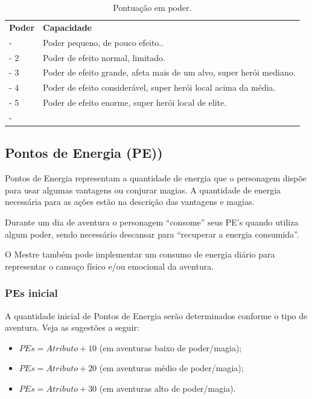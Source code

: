 \begin{table}[htb]
	\centering\smaller
	\caption{Pontuação em poder.}
	\begin{tabu} to 0.85\textwidth{|X[c]|X[2c]|} \hline
		\textbf{Poder}	 &	\textbf{Capacidade}  \\ \tabucline-
				 		& Poder pequeno, de pouco efeito..	\\ \tabucline-
		2		  		& Poder de efeito normal, limitado. \\ \tabucline-
		3		 		& Poder de efeito grande, afeta mais de um alvo, super herói mediano. 	\\ \tabucline-
		4		   		& Poder de efeito considerável, super herói local acima da média. 		\\ \tabucline-
		5		 	  	& Poder de efeito enorme, super herói local de elite. 	\\ \tabucline-
	\end{tabu}
	\label{tbl:poder}
\end{table}


\subsection{\label{sec:pes}Pontos de Energia (PE))}
Pontos de Energia representam a quantidade de energia que o personagem dispõe para usar algumas vantagens ou conjurar magias. A quantidade de energia necessária para as ações estão na descrição das vantagens e magias.

Durante um dia de aventura o personagem ``consome'' seus PE's quando utiliza algum poder, sendo necessário descansar para ``recuperar a energia consumida''. 

O Mestre também pode implementar um consumo de energia diário para representar o cansaço físico e/ou emocional da aventura.

\subsubsection*{PEs inicial} 
A quantidade inicial de Pontos de Energia serão determinados conforme o tipo de aventura. Veja as sugestões a seguir:
\begin{itemize}
	\item $PEs = Atributo+10$ (em aventuras baixo de poder/magia);
	\item $PEs = Atributo+20$ (em aventuras médio de poder/magia);
	\item $PEs = Atributo+30$ (em aventuras alto de poder/magia). 
\end{itemize}

